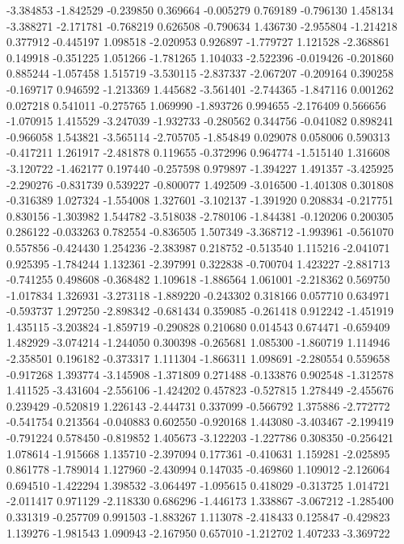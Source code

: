 -3.384853
-1.842529
-0.239850
0.369664
-0.005279
0.769189
-0.796130
1.458134
-3.388271
-2.171781
-0.768219
0.626508
-0.790634
1.436730
-2.955804
-1.214218
0.377912
-0.445197
1.098518
-2.020953
0.926897
-1.779727
1.121528
-2.368861
0.149918
-0.351225
1.051266
-1.781265
1.104033
-2.522396
-0.019426
-0.201860
0.885244
-1.057458
1.515719
-3.530115
-2.837337
-2.067207
-0.209164
0.390258
-0.169717
0.946592
-1.213369
1.445682
-3.561401
-2.744365
-1.847116
0.001262
0.027218
0.541011
-0.275765
1.069990
-1.893726
0.994655
-2.176409
0.566656
-1.070915
1.415529
-3.247039
-1.932733
-0.280562
0.344756
-0.041082
0.898241
-0.966058
1.543821
-3.565114
-2.705705
-1.854849
0.029078
0.058006
0.590313
-0.417211
1.261917
-2.481878
0.119655
-0.372996
0.964774
-1.515140
1.316608
-3.120722
-1.462177
0.197440
-0.257598
0.979897
-1.394227
1.491357
-3.425925
-2.290276
-0.831739
0.539227
-0.800077
1.492509
-3.016500
-1.401308
0.301808
-0.316389
1.027324
-1.554008
1.327601
-3.102137
-1.391920
0.208834
-0.217751
0.830156
-1.303982
1.544782
-3.518038
-2.780106
-1.844381
-0.120206
0.200305
0.286122
-0.033263
0.782554
-0.836505
1.507349
-3.368712
-1.993961
-0.561070
0.557856
-0.424430
1.254236
-2.383987
0.218752
-0.513540
1.115216
-2.041071
0.925395
-1.784244
1.132361
-2.397991
0.322838
-0.700704
1.423227
-2.881713
-0.741255
0.498608
-0.368482
1.109618
-1.886564
1.061001
-2.218362
0.569750
-1.017834
1.326931
-3.273118
-1.889220
-0.243302
0.318166
0.057710
0.634971
-0.593737
1.297250
-2.898342
-0.681434
0.359085
-0.261418
0.912242
-1.451919
1.435115
-3.203824
-1.859719
-0.290828
0.210680
0.014543
0.674471
-0.659409
1.482929
-3.074214
-1.244050
0.300398
-0.265681
1.085300
-1.860719
1.114946
-2.358501
0.196182
-0.373317
1.111304
-1.866311
1.098691
-2.280554
0.559658
-0.917268
1.393774
-3.145908
-1.371809
0.271488
-0.133876
0.902548
-1.312578
1.411525
-3.431604
-2.556106
-1.424202
0.457823
-0.527815
1.278449
-2.455676
0.239429
-0.520819
1.226143
-2.444731
0.337099
-0.566792
1.375886
-2.772772
-0.541754
0.213564
-0.040883
0.602550
-0.920168
1.443080
-3.403467
-2.199419
-0.791224
0.578450
-0.819852
1.405673
-3.122203
-1.227786
0.308350
-0.256421
1.078614
-1.915668
1.135710
-2.397094
0.177361
-0.410631
1.159281
-2.025895
0.861778
-1.789014
1.127960
-2.430994
0.147035
-0.469860
1.109012
-2.126064
0.694510
-1.422294
1.398532
-3.064497
-1.095615
0.418029
-0.313725
1.014721
-2.011417
0.971129
-2.118330
0.686296
-1.446173
1.338867
-3.067212
-1.285400
0.331319
-0.257709
0.991503
-1.883267
1.113078
-2.418433
0.125847
-0.429823
1.139276
-1.981543
1.090943
-2.167950
0.657010
-1.212702
1.407233
-3.369722
